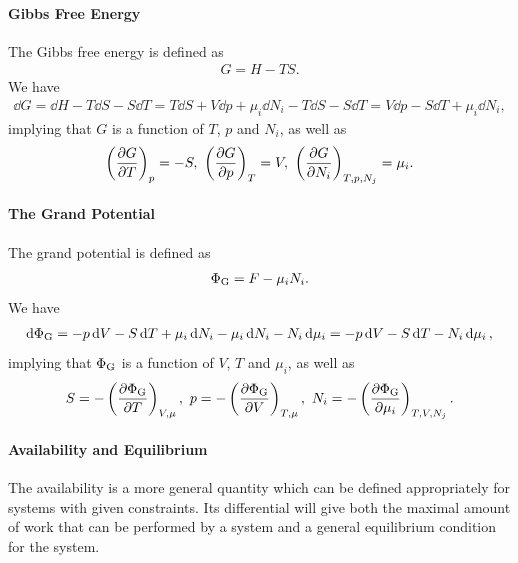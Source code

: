 \paragraph{Gibbs Free Energy}
The Gibbs free energy is defined as
\begin{align*}
	G = H - TS.
\end{align*}
We have
\begin{align*}
	\dd{G} = \dd{H} - T\dd{S} - S\dd{T} = T\dd{S} + V\dd{p} + \mu_{i}\dd{N_{i}} - T\dd{S} - S\dd{T} = V\dd{p} - S\dd{T} + \mu_{i}\dd{N_{i}},
\end{align*}
implying that $G$ is a function of $T$, $p$ and $N_{i}$, as well as
\begin{align*}
	\fix{\pdv{G}{T}}{p} = -S,\ \fix{\pdv{G}{p}}{T} = V,\ \fix{\pdv{G}{N_{i}}}{T, p,  N_{j}} = \mu_{i}.
\end{align*}

\paragraph{The Grand Potential}
The grand potential is defined as
\begin{align*}
	\Phi_{\text{G}} = F - \mu_{i}N_{i}.
\end{align*}
We have
\begin{align*}
	\dd{\Phi_{\text{G}}} = -p\dd{V} - S\dd{T} + \mu_{i}\dd{N_{i}} - \mu_{i}\dd{N_{i}} - N_{i}\dd{\mu_{i}} = -p\dd{V} - S\dd{T} - N_{i}\dd{\mu_{i}},
\end{align*}
implying that $\Phi_{\text{G}}$ is a function of $V$, $T$ and $\mu_{i}$, as well as
\begin{align*}
	S = - \left(\pdv{\Phi_{\text{G}}}{T}\right)_{V, \mu},\ p = - \left(\pdv{\Phi_{\text{G}}}{V}\right)_{T, \mu},\ N_{i} = - \left(\pdv{\Phi_{\text{G}}}{\mu_{i}}\right)_{T, V, N_{j}}.
\end{align*}

\paragraph{Availability and Equilibrium}
The availability is a more general quantity which can be defined appropriately for systems with given constraints. Its differential will give both the maximal amount of work that can be performed by a system and a general equilibrium condition for the system.

